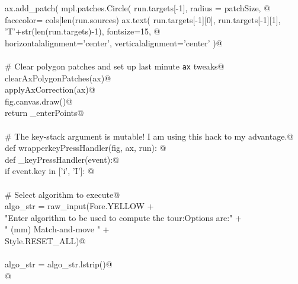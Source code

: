 \documentclass[10pt, english, oneside]{report}
\begin{document}
\begin{appendices}
\begin{flushleft}
\begin{list}{}{}
\mbox{}\verb@                      ax.add_patch( mpl.patches.Circle( run.targets[-1], radius = patchSize, @\\
\mbox{}\verb@                                                       facecolor= cols[len(run.sources)%len(cols)], edgecolor='black', lw=1.0 ))@\\
\mbox{}\verb@                      ax.text( run.targets[-1][0], run.targets[-1][1], 'T'+str(len(run.targets)-1), fontsize=15, @\\
\mbox{}\verb@                               horizontalalignment='center', verticalalignment='center' )@\\
\mbox{}\verb@@\\
\mbox{}\verb@             # Clear polygon patches and set up last minute \verb|ax| tweaks@\\
\mbox{}\verb@             clearAxPolygonPatches(ax)@\\
\mbox{}\verb@             applyAxCorrection(ax)@\\
\mbox{}\verb@             fig.canvas.draw()@\\
\mbox{}\verb@      return _enterPoints@\\
\mbox{}\verb@@\\
\mbox{}\verb@    # The key-stack argument is mutable! I am using this hack to my advantage.@\\
\mbox{}\verb@    def wrapperkeyPressHandler(fig, ax, run): @\\
\mbox{}\verb@           def _keyPressHandler(event):@\\
\mbox{}\verb@               if event.key in ['i', 'I']:  @\\
\mbox{}\verb@@\\
\mbox{}\verb@                    # Select algorithm to execute@\\
\mbox{}\verb@                    algo_str = raw_input(Fore.YELLOW                                             +\@\\
\mbox{}\verb@                            "Enter algorithm to be used to compute the tour:\n Options are:\n"   +\@\\
\mbox{}\verb@                            " (mm)     Match-and-move \n"                            +\@\\
\mbox{}\verb@                            Style.RESET_ALL)@\\
\mbox{}\verb@@\\
\mbox{}\verb@                    algo_str = algo_str.lstrip()@\\
\mbox{}\verb@                     @\\

\end{list}
\end{flushleft}
\end{appendices}
\end{document}
